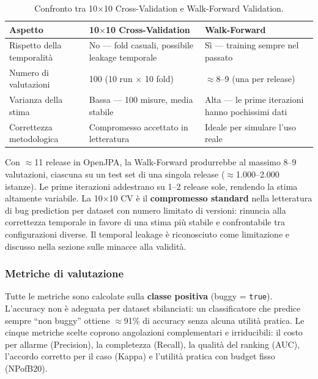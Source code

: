 \begin{table}[h!]
\centering
\small
\begin{tabular}{@{}p{}p{}p{}@{}}
\toprule
\textbf{Aspetto} & \textbf{10$\times$10 Cross-Validation} & \textbf{Walk-Forward} \\
\midrule
Rispetto della temporalità &
No --- fold casuali, possibile leakage temporale &
Sì --- training sempre nel passato \\
\addlinespace
Numero di valutazioni &
100 (10 run $\times$ 10 fold) &
$\approx$8--9 (una per release) \\
\addlinespace
Varianza della stima &
Bassa --- 100 misure, media stabile &
Alta --- le prime iterazioni hanno pochissimi dati \\
\addlinespace
Correttezza metodologica &
Compromesso accettato in letteratura &
Ideale per simulare l'uso reale \\
\bottomrule
\end{tabular}
\caption{Confronto tra 10$\times$10 Cross-Validation e Walk-Forward Validation.}
\end{table}

Con $\approx$11 release in OpenJPA, la Walk-Forward produrrebbe al massimo 8--9
valutazioni, ciascuna su un test set di una singola release ($\approx$1.000--2.000
istanze). Le prime iterazioni addestrano su 1--2 release sole, rendendo la stima
altamente variabile. La 10$\times$10 CV è il \textbf{compromesso standard} nella
letteratura di bug prediction per dataset con numero limitato di versioni: rinuncia alla
correttezza temporale in favore di una stima più stabile e confrontabile tra
configurazioni diverse. Il temporal leakage è riconosciuto come limitazione e discusso
nella sezione sulle minacce alla validità.

\subsubsection{Metriche di valutazione}

Tutte le metriche sono calcolate sulla \textbf{classe positiva} (buggy = \texttt{true}).
L'accuracy non è adeguata per dataset sbilanciati: un classificatore che predice sempre
``non buggy'' ottiene $\approx$91\% di accuracy senza alcuna utilità pratica. Le cinque
metriche scelte coprono angolazioni complementari e irriducibili: il costo per allarme
(Precision), la completezza (Recall), la qualità del ranking (AUC), l'accordo corretto
per il caso (Kappa) e l'utilità pratica con budget fisso (NPofB20).

